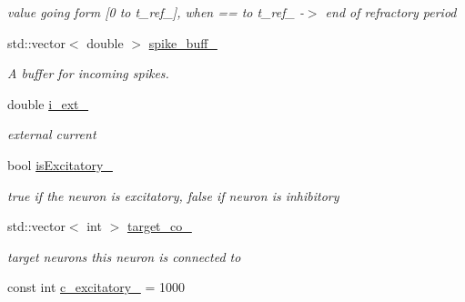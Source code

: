 \begin{DoxyCompactItemize}
\begin{DoxyCompactList}\small\item\em value going form \mbox{[}0 to t\-\_\-ref\-\_\-\mbox{]}, when == to t\-\_\-ref\-\_\- -\/$>$ end of refractory period \end{DoxyCompactList}\item 
\hypertarget{classNeuron_a32cf07756d53a72ddd15512dfc4f3a54}{std\-::vector$<$ double $>$ \hyperlink{classNeuron_a32cf07756d53a72ddd15512dfc4f3a54}{spike\-\_\-buff\-\_\-}}\label{classNeuron_a32cf07756d53a72ddd15512dfc4f3a54}

\begin{DoxyCompactList}\small\item\em A buffer for incoming spikes. \end{DoxyCompactList}\item 
\hypertarget{classNeuron_a9e78a659c221d8ca1e9bd08d98d0ecb3}{double \hyperlink{classNeuron_a9e78a659c221d8ca1e9bd08d98d0ecb3}{i\-\_\-ext\-\_\-}}\label{classNeuron_a9e78a659c221d8ca1e9bd08d98d0ecb3}

\begin{DoxyCompactList}\small\item\em external current \end{DoxyCompactList}\item 
\hypertarget{classNeuron_af4443f35a3ffae3e97d68a72fb11c68d}{bool \hyperlink{classNeuron_af4443f35a3ffae3e97d68a72fb11c68d}{is\-Excitatory\-\_\-}}\label{classNeuron_af4443f35a3ffae3e97d68a72fb11c68d}

\begin{DoxyCompactList}\small\item\em true if the neuron is excitatory, false if neuron is inhibitory \end{DoxyCompactList}\item 
\hypertarget{classNeuron_adced6d874e6930b44d3a07ff5e907ba4}{std\-::vector$<$ int $>$ \hyperlink{classNeuron_adced6d874e6930b44d3a07ff5e907ba4}{target\-\_\-co\-\_\-}}\label{classNeuron_adced6d874e6930b44d3a07ff5e907ba4}

\begin{DoxyCompactList}\small\item\em target neurons this neuron is connected to \end{DoxyCompactList}\item 
\hypertarget{classNeuron_accbc344e3d3e3a44073b251c647727bd}{const int \hyperlink{classNeuron_accbc344e3d3e3a44073b251c647727bd}{c\-\_\-excitatory\-\_\-} = 1000}\label{classNeuron_accbc344e3d3e3a44073b251c647727bd}


\end{DoxyCompactItemize}

